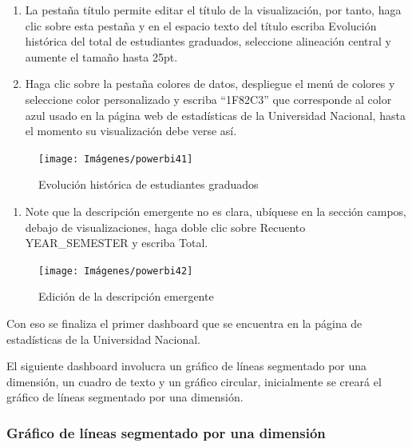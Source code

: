 \documentclass[
]{book}
\providecommand{\tightlist}{%
  \setlength{\itemsep}{0pt}\setlength{\parskip}{0pt}}
\begin{document}
\begin{enumerate}
\def\labelenumi{\arabic{enumi}.}
\setcounter{enumi}{8}
\item
  La pestaña título permite editar el título de la visualización, por tanto, haga clic sobre esta pestaña y en el espacio texto del título escriba Evolución histórica del total de estudiantes graduados, seleccione alineación central y aumente el tamaño hasta 25pt.
\item
  Haga clic sobre la pestaña colores de datos, despliegue el menú de colores y seleccione color personalizado y escriba ``1F82C3'' que corresponde al color azul usado en la página web de estadísticas de la Universidad Nacional, hasta el momento su visualización debe verse así.
\end{enumerate}

\begin{figure}

{\centering \texttt{[image: Imágenes/powerbi41]} 

}

\caption{Evolución histórica de estudiantes graduados}\label{fig:paso10lineaspowerbi-fig}
\end{figure}

\begin{enumerate}
\def\labelenumi{\arabic{enumi}.}
\setcounter{enumi}{10}
\tightlist
\item
  Note que la descripción emergente no es clara, ubíquese en la sección campos, debajo de visualizaciones, haga doble clic sobre Recuento YEAR\_SEMESTER y escriba Total.
\end{enumerate}

\begin{figure}

{\centering \texttt{[image: Imágenes/powerbi42]} 

}

\caption{Edición de la descripción emergente}\label{fig:paso11lineaspowerbi-fig}
\end{figure}

Con eso se finaliza el primer dashboard que se encuentra en la página de estadísticas de la Universidad Nacional.

El siguiente dashboard involucra un gráfico de líneas segmentado por una dimensión, un cuadro de texto y un gráfico circular, inicialmente se creará el gráfico de líneas segmentado por una dimensión.

\hypertarget{graficodelineassegmentadopowerbi}{%
\subsubsection{Gráfico de líneas segmentado por una dimensión}\label{graficodelineassegmentadopowerbi}}
\end{document}

